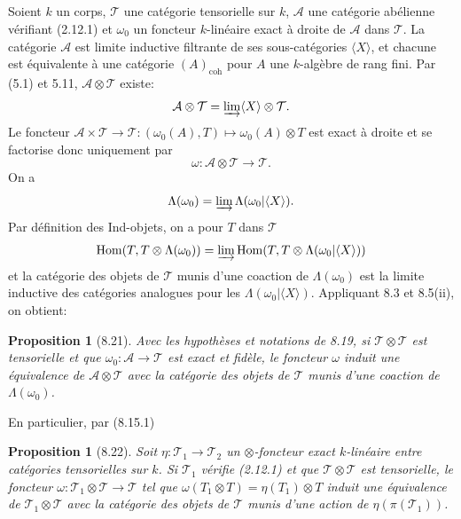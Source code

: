 \documentclass[12pt,a4paper]{article}
\theoremstyle{plain}
\newtheorem{proposition}[theorem]{Proposition}
\theoremstyle{definition}
\DeclareMathOperator{\Hom}{Hom}
\newcommand{\coh}{\mathrm{coh}}
\begin{document}
\subsection{}

Soient $k$ un corps, $\mathcal{T}$ une catégorie tensorielle sur $k$, $\mathcal{A}$ une catégorie abélienne vérifiant (2.12.1) et $\omega_0$ un foncteur $k$-linéaire exact à droite de $\mathcal{A}$ dans $\mathcal{T}$. La catégorie $\mathcal{A}$ est limite inductive filtrante de ses sous-catégories $\langle X \rangle$, et chacune est équivalente à une catégorie $(A)_{\coh}$ pour $A$ une $k$-algèbre de rang fini. Par (5.1) et 5.11, $\mathcal{A} \otimes \mathcal{T}$ existe:
\[
\mathcal{A} \otimes \mathcal{T} = \varinjlim \langle X \rangle \otimes \mathcal{T}.
\]
Le foncteur $\mathcal{A} \times \mathcal{T} \to \mathcal{T} : (\omega_0(A), T) \mapsto \omega_0(A) \otimes T$ est exact à droite et se factorise donc uniquement par
\[
\omega : \mathcal{A} \otimes \mathcal{T} \to \mathcal{T}.
\]
On a
\[
\Lambda(\omega_0) = \varinjlim \Lambda(\omega_0 | \langle X \rangle).
\]
Par définition des Ind-objets, on a pour $T$ dans $\mathcal{T}$
\[
\Hom(T, T \otimes \Lambda(\omega_0)) = \varinjlim \Hom(T, T \otimes \Lambda(\omega_0 | \langle X \rangle))
\]
et la catégorie des objets de $\mathcal{T}$ munis d'une coaction de $\Lambda(\omega_0)$ est la limite inductive des catégories analogues pour les $\Lambda(\omega_0 | \langle X \rangle)$. Appliquant 8.3 et 8.5(ii), on obtient:

\begin{proposition}[8.21]
Avec les hypothèses et notations de 8.19, si $\mathcal{T} \otimes \mathcal{T}$ est tensorielle et que $\omega_0 : \mathcal{A} \to \mathcal{T}$ est exact et fidèle, le foncteur $\omega$ induit une équivalence de $\mathcal{A} \otimes \mathcal{T}$ avec la catégorie des objets de $\mathcal{T}$ munis d'une coaction de $\Lambda(\omega_0)$.
\end{proposition}

En particulier, par (8.15.1)
\begin{proposition}[8.22]
Soit $\eta : \mathcal{T}_1 \to \mathcal{T}_2$ un $\otimes$-foncteur exact $k$-linéaire entre catégories tensorielles sur $k$. Si $\mathcal{T}_1$ vérifie (2.12.1) et que $\mathcal{T} \otimes \mathcal{T}$ est tensorielle, le foncteur $\omega : \mathcal{T}_1 \otimes \mathcal{T} \to \mathcal{T}$ tel que $\omega(T_1 \otimes T) = \eta(T_1) \otimes T$ induit une équivalence de $\mathcal{T}_1 \otimes \mathcal{T}$ avec la catégorie des objets de $\mathcal{T}$ munis d'une action de $\eta(\pi(\mathcal{T}_1))$.
\end{proposition}
\end{document}
